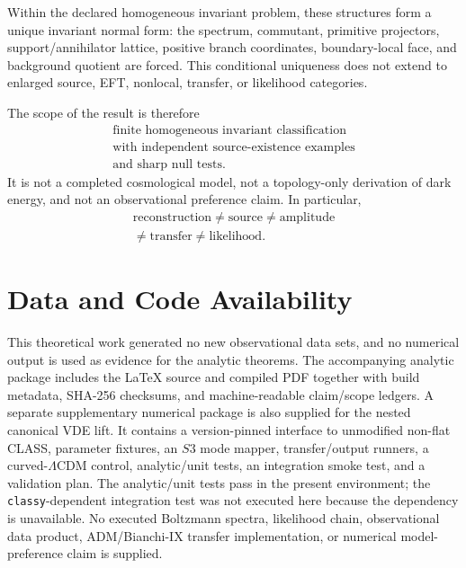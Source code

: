 \documentclass[11pt,a4paper]{article}
\def\Sthree{S3}%
\numberwithin{equation}{section}
\theoremstyle{definition}
\theoremstyle{plain}
\theoremstyle{remark}
\newcommand{\Sthree}{S^3}
\begin{document}
Within the declared homogeneous invariant problem, these structures form a unique invariant normal form: the spectrum, commutant, primitive projectors, support/annihilator lattice, positive branch coordinates, boundary-local face, and background quotient are forced.  This conditional uniqueness does not extend to enlarged source, EFT, nonlocal, transfer, or likelihood categories.

The scope of the result is therefore
\begin{equation}
\boxed{
\begin{array}{c}
\text{finite homogeneous invariant classification}\\
\text{with independent source-existence examples}\\
\text{and sharp null tests.}
\end{array}}
\end{equation}
It is not a completed cosmological model, not a topology-only derivation of dark energy, and not an observational preference claim.  In particular,
\begin{equation}
\begin{array}{c}
\text{reconstruction}\neq\text{source}\neq\text{amplitude}\\
\neq\text{transfer}\neq\text{likelihood}.
\end{array}
\end{equation}

\section*{Data and Code Availability}
This theoretical work generated no new observational data sets, and no numerical output is used as evidence for the analytic theorems.  The accompanying analytic package includes the LaTeX source and compiled PDF together with build metadata, SHA-256 checksums, and machine-readable claim/scope ledgers.  A separate supplementary numerical package is also supplied for the nested canonical VDE lift.  It contains a version-pinned interface to unmodified non-flat CLASS, parameter fixtures, an \(\Sthree\) mode mapper, transfer/output runners, a curved-\(\Lambda\)CDM control, analytic/unit tests, an integration smoke test, and a validation plan.  The analytic/unit tests pass in the present environment; the \texttt{classy}-dependent integration test was not executed here because the dependency is unavailable.  No executed Boltzmann spectra, likelihood chain, observational data product, ADM/Bianchi-IX transfer implementation, or numerical model-preference claim is supplied.
\end{document}
